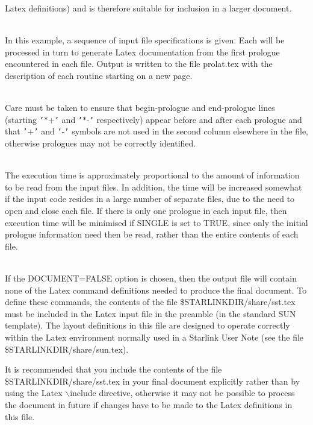 \documentclass[twoside,11pt]{article}
\renewcommand{\_}{\texttt{\symbol{95}}}
\newlength{\sstexampleslength}
\newcommand{\sstexamplesubsection}[2]{\sloppy
\item[\parbox{\sstexampleslength}{\ssttt #1}] \mbox{} \vspace{1.0ex}
\\ #2 }
\newcommand{\sstnotes}[1]{\item[Notes:] \mbox{} \\[1.3ex] #1}
\newcommand{\sstdiytopic}[2]{\item[{\hspace{-0.35em}#1\hspace{-0.35em}:}]
\mbox{} \\[1.3ex] #2}
\newcommand{\sstexamplesubsection}[2]{\item[{\ssttt #1}] #2}
\newcommand{\sstnotes}[1]{\item[Notes:] #1 }
\newcommand{\sstdiytopic}[2]{\item[{#1}] #2 }
\begin{document}
{{{         Latex definitions) and is therefore suitable for inclusion in
         a larger document.
      }
      \sstexamplesubsection{
         PROLAT IN=[{\tt "}$*$.FOR{\tt "},{\tt "}$*$.GEN{\tt "}] NOATASK PAGE
      }{
         In this example, a sequence of input file specifications is
         given. Each will be processed in turn to generate Latex
         documentation from the first prologue encountered in each
         file.  Output is written to the file prolat.tex with the
         description of each routine starting on a new page.
      }
   }
   \sstnotes{
      Care must be taken to ensure that begin-prologue and end-prologue
      lines (starting {\tt '}$*$$+${\tt '} and {\tt '}$*$-{\tt '} respectively) appear before and
      after each prologue and that {\tt '}$+${\tt '} and {\tt '}-{\tt '} symbols are not used in
      the second column elsewhere in the file, otherwise prologues may
      not be correctly identified.
   }
   \sstdiytopic{
      Timing
   }{
      The execution time is approximately proportional to the amount of
      information to be read from the input files. In addition, the
      time will be increased somewhat if the input code resides in a
      large number of separate files, due to the need to open and close
      each file. If there is only one prologue in each input file, then
      execution time will be minimised if SINGLE is set to TRUE, since
      only the initial prologue information need then be read, rather
      than the entire contents of each file.
   }
   \sstdiytopic{
      Latex Definitions
   }{
      If the DOCUMENT=FALSE option is chosen, then the output file will
      contain none of the Latex command definitions needed to produce
      the final document. To define these commands, the contents of the
      file \$STARLINK\_DIR/share/sst.tex must be included in the Latex
      input file in the preamble (in the standard SUN template). The
      layout definitions in this file are designed to operate correctly
      within the Latex environment normally used in a Starlink User Note
      (see the file \$STARLINK\_DIR/share/sun.tex).

      It is recommended that you include the contents of the file
      \$STARLINK\_DIR/share/sst.tex in your final document explicitly
      rather than by using the Latex $\backslash$include directive, otherwise it
      may not be possible to process the document in future if changes
      have to be made to the Latex definitions in this file.
   }
}
\newpage
\end{document}
